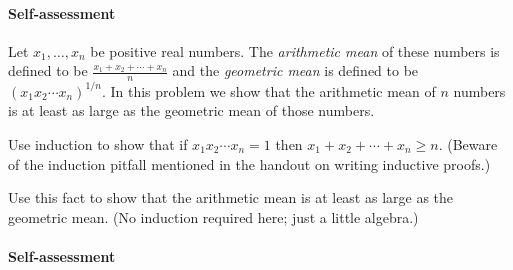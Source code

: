 \documentclass{ks-pset}
\begin{document}
\begin{solution}
  \paragraph{Self-assessment}
\end{solution}

\begin{problem}

  Let \(x_{1}, \dotsc, x_{n}\) be positive real numbers.  The \emph{arithmetic
  mean} of these numbers is defined to be \(\frac{x_1+x_2+\dotsb+x_n}{n}\) and
  the \emph{geometric mean} is defined to be \((x_1 x_2 \dotsm x_n)^{1/n}\). In
  this problem we show that the arithmetic mean of \(n\) numbers is at least as
  large as the geometric mean of those numbers.
  \begin{subproblems}
    \item Use induction to show that if \(x_1 x_2 \dotsm x_n=1\) then
      \(x_1+x_2+\dotsb+x_n≥n\).  (Beware of the induction pitfall mentioned in
      the handout on writing inductive proofs.)
    \item Use this fact to show that the arithmetic mean is at least as large
      as the geometric mean.  (No induction required here; just a little
      algebra.)
  \end{subproblems}

\end{problem}

\begin{solution}
  \paragraph{Self-assessment}
\end{solution}
\end{document}
